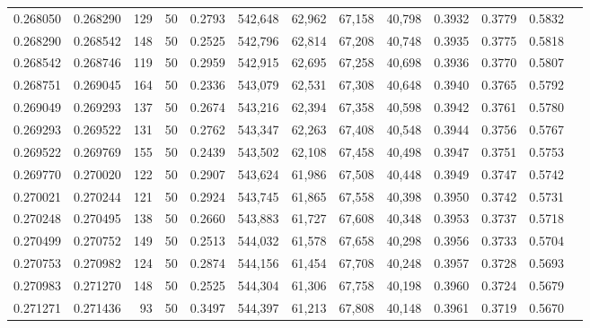 \begin{tabular}{rrrrrrrrrrrrr}
0.268050 & 0.268290 &   129 &  50 &                                     0.2793 & 542,648 &  62,962 &  67,158 &  40,798 & 0.3932 & 0.3779 & 0.5832 \\
0.268290 & 0.268542 &   148 &  50 &                                     0.2525 & 542,796 &  62,814 &  67,208 &  40,748 & 0.3935 & 0.3775 & 0.5818 \\
0.268542 & 0.268746 &   119 &  50 &                                     0.2959 & 542,915 &  62,695 &  67,258 &  40,698 & 0.3936 & 0.3770 & 0.5807 \\
0.268751 & 0.269045 &   164 &  50 &                                     0.2336 & 543,079 &  62,531 &  67,308 &  40,648 & 0.3940 & 0.3765 & 0.5792 \\
0.269049 & 0.269293 &   137 &  50 &                                     0.2674 & 543,216 &  62,394 &  67,358 &  40,598 & 0.3942 & 0.3761 & 0.5780 \\
0.269293 & 0.269522 &   131 &  50 &                                     0.2762 & 543,347 &  62,263 &  67,408 &  40,548 & 0.3944 & 0.3756 & 0.5767 \\
0.269522 & 0.269769 &   155 &  50 &                                     0.2439 & 543,502 &  62,108 &  67,458 &  40,498 & 0.3947 & 0.3751 & 0.5753 \\
0.269770 & 0.270020 &   122 &  50 &                                     0.2907 & 543,624 &  61,986 &  67,508 &  40,448 & 0.3949 & 0.3747 & 0.5742 \\
0.270021 & 0.270244 &   121 &  50 &                                     0.2924 & 543,745 &  61,865 &  67,558 &  40,398 & 0.3950 & 0.3742 & 0.5731 \\
0.270248 & 0.270495 &   138 &  50 &                                     0.2660 & 543,883 &  61,727 &  67,608 &  40,348 & 0.3953 & 0.3737 & 0.5718 \\
0.270499 & 0.270752 &   149 &  50 &                                     0.2513 & 544,032 &  61,578 &  67,658 &  40,298 & 0.3956 & 0.3733 & 0.5704 \\
0.270753 & 0.270982 &   124 &  50 &                                     0.2874 & 544,156 &  61,454 &  67,708 &  40,248 & 0.3957 & 0.3728 & 0.5693 \\
0.270983 & 0.271270 &   148 &  50 &                                     0.2525 & 544,304 &  61,306 &  67,758 &  40,198 & 0.3960 & 0.3724 & 0.5679 \\
0.271271 & 0.271436 &    93 &  50 &                                     0.3497 & 544,397 &  61,213 &  67,808 &  40,148 & 0.3961 & 0.3719 & 0.5670 \\

\end{tabular}
